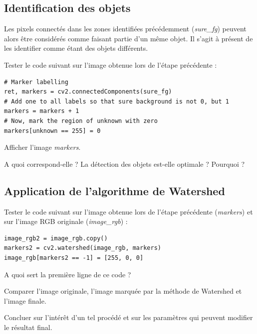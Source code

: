 \documentclass[a4paper,11pt,titlepage]{article} %
\begin{document}
\subsection{Identification des objets}

Les pixels connectés dans les zones identifiées précédemment (\textsl{sure\_fg}) peuvent alors être considérés comme faisant partie d'un même objet. Il s'agit à présent de les identifier comme étant des objets différents.

\Manip Tester le code suivant sur l'image obtenue lors de l'étape précédente :

\begin{lstlisting}
# Marker labelling
ret, markers = cv2.connectedComponents(sure_fg)
# Add one to all labels so that sure background is not 0, but 1
markers = markers + 1
# Now, mark the region of unknown with zero
markers[unknown == 255] = 0
\end{lstlisting}

\Manip Afficher l'image \textsl{markers}.

\Quest A quoi correspond-elle ? La détection des objets est-elle optimale ? Pourquoi ?

\subsection{Application de l'algorithme de Watershed}

\Manip Tester le code suivant sur l'image obtenue lors de l'étape précédente (\textsl{markers}) et sur l'image RGB originale (\textsl{image\_rgb}) :

\begin{lstlisting}
image_rgb2 = image_rgb.copy()
markers2 = cv2.watershed(image_rgb, markers)
image_rgb[markers2 == -1] = [255, 0, 0]
\end{lstlisting}

\Quest A quoi sert la première ligne de ce code ?

\Manip Comparer l'image originale, l'image marquée par la méthode de Watershed et l'image finale.

\Quest Concluer sur l'intérêt d'un tel procédé et sur les paramètres qui peuvent modifier le résultat final.

\end{document}
